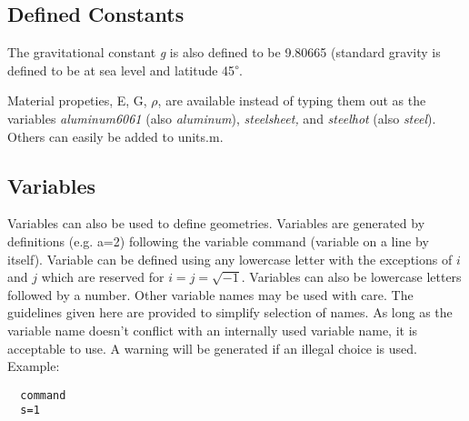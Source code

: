 \documentclass[12pt]{article}
\newcommand*{\command}[1]{\textsf{#1}}
\newcommand*{\variable}[1]{\textit{#1}}
\begin{document}
\subsection{Defined Constants}
The gravitational constant \variable{g} is also defined to be 9.80665 (standard gravity is defined to be at sea level and latitude 45\textsuperscript{$\circ$}.

Material propeties, E, G, $\rho$, are available instead of typing them out as the variables \variable{aluminum6061} (also \variable{aluminum}), \variable{steelsheet,} and \variable{steelhot} (also \variable{steel}). Others can easily be added to \textsf{units.m}.

\subsection{Variables}
Variables can also be used to define geometries.
Variables are generated by definitions (e.g. \command{a=2}) following
the variable command (\command{variable} on a line by itself).
Variable can be defined using any lowercase letter with the
exceptions of $i$ and $j$ which are reserved for $i=j=\sqrt{-1}$.
Variables can also be lowercase letters followed by a number. Other
variable names may be used with care. The guidelines given here are
provided to simplify selection of names. As long as the variable name
doesn't conflict with an internally used variable name, it is
acceptable to use. A warning will be generated if an illegal choice is
used.
\\Example:\\
\begin{lstlisting}
  command
  s=1
\end{lstlisting}
\end{document}
